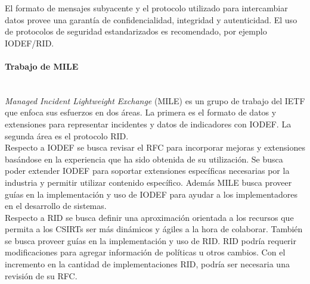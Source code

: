 El formato de mensajes subyacente y el protocolo utilizado para intercambiar 
datos provee una garantía de confidencialidad, integridad y autenticidad. El uso 
de protocolos de seguridad estandarizados es recomendado, por ejemplo 
IODEF/RID.

\paragraph{Trabajo de MILE}\ \\

\textit{Managed Incident Lightweight Exchange} (MILE) es un grupo de trabajo del IETF que 
enfoca sus esfuerzos en dos áreas. La primera es el formato de datos y 
extensiones para representar incidentes y datos de indicadores con IODEF. La segunda área 
es el protocolo RID.\\

Respecto a IODEF se busca revisar el RFC para incorporar mejoras y extensiones 
basándose en la experiencia que ha sido obtenida de su utilización. Se busca poder extender IODEF para 
soportar extensiones específicas necesarias por la industria y permitir utilizar 
contenido específico. Además MILE busca proveer guías en la implementación y uso 
de IODEF para ayudar a los implementadores en el desarrollo de sistemas.\\

Respecto a RID se busca definir una aproximación orientada a los recursos que 
permita a los CSIRTs ser más dinámicos y ágiles a la hora de colaborar. También 
se busca proveer guías en la implementación y uso de RID. RID podría requerir 
modificaciones para agregar información de políticas u otros cambios. Con el 
incremento en la cantidad de implementaciones RID, podría ser necesaria una 
revisión de su RFC.


